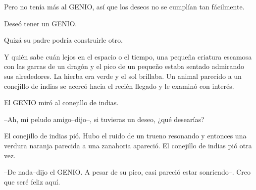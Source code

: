 Pero no tenía más al GENIO, así que los deseos no se cumplían tan
fácilmente.

Deseó tener un GENIO.

Quizá su padre podría construirle otro.

Y quién sabe cuán lejos en el espacio o el tiempo, una pequeña criatura
escamosa con las garras de un dragón y el pico de un pequeño estaba
sentado admirando sus alrededores. La hierba era verde y el sol
brillaba. Un animal parecido a un conejillo de indias se acercó hacia el
recién llegado y le examinó con interés.

El GENIO miró al conejillo de indias.

--Ah, mi peludo amigo--dijo--, si tuvieras un deseo, ¿qué desearías?

El conejillo de indias pió. Hubo el ruido de un trueno resonando y
entonces una verdura naranja parecida a una zanahoria apareció. El
conejillo de indias pió otra vez.

--De nada--dijo el GENIO. A pesar de su pico, casi pareció estar
sonriendo--. Creo que seré feliz aquí.
